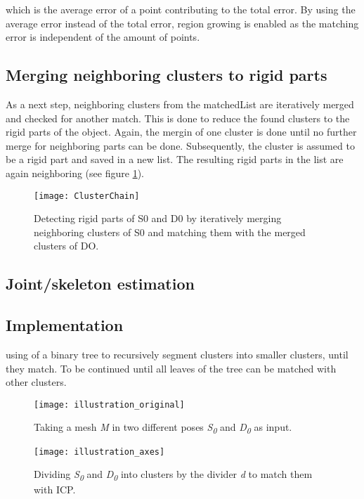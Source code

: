 which is the average error of a point contributing to the total error. By using the average error instead of the total error, region growing is enabled as the matching error is independent of the amount of points.
 
 \subsection{Merging neighboring clusters to rigid parts}
 
 As a next step, neighboring clusters from the matchedList are iteratively merged and checked for another match. This is done to reduce the found clusters to the rigid parts of the object.
 Again, the mergin of one cluster is done until no further merge for neighboring parts can be done. Subsequently, the cluster is assumed to be a rigid part and saved in a new list. The resulting rigid parts in the list are again neighboring (see figure \ref{fig:clusterChain}). 
 
 \begin{figure}
 	\centering
 	\texttt{[image: ClusterChain]}
 	\caption{Detecting rigid parts of S0 and D0 by iteratively merging neighboring clusters of S0 and matching them with the merged clusters of DO.}
 	\label{fig:clusterChain}
 \end{figure}
 
 \subsection{Joint/skeleton estimation}
 
 \subsection{Implementation}
 
 using of a binary tree to recursively segment clusters into smaller clusters, until they match. To be continued until all leaves of the tree can be matched with other clusters.
 
  \begin{figure}
  	\centering
  	\texttt{[image: illustration\_original]}
  	\caption{Taking a mesh \textit{M} in two different poses \textit{S\textsubscript{0}} and \textit{D\textsubscript{0}} as input.}
  	\label{fig:dc_original_p2}
  \end{figure}
 
 \begin{figure}
 	\centering
 	\texttt{[image: illustration\_axes]}
 	\caption{Dividing \textit{S\textsubscript{0}} and \textit{D\textsubscript{0}} into clusters by the divider \textit{d} to match them with ICP.}
 	\label{fig:dc_axes_2p}
 \end{figure}

